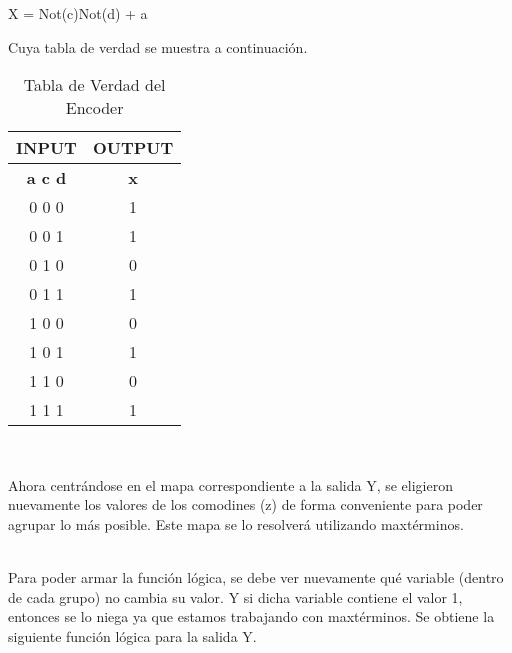 \begin{center}
X = Not(c)Not(d) + a
\end{center}
Cuya tabla de verdad se muestra a continuación.
\begin{center}
	\begin{table}[h!]
		\begin{center}
			\caption{Tabla de Verdad del Encoder}
			\begin{tabular}{|c|c|}
				\hline
				\textbf{INPUT} & \textbf{OUTPUT} \\
				\hline
				\textbf{a c d} & \textbf{x} \\
				\hline
				0 0 0 & 1\\
				\hline
				0 0 1 & 1 \\
				\hline
				0 1 0 & 0\\
				\hline
				0 1 1 & 1\\
				\hline
				1 0 0 & 0\\
				\hline
				1 0 1 & 1\\
				\hline
				1 1 0 & 0\\
				\hline
				1 1 1 & 1\\
				\hline
			\end{tabular} \\
		\end{center}
	\end{table}
\end{center}

Ahora centr\'andose en el mapa correspondiente a la salida Y, se eligieron nuevamente los valores de los comodines (z) de forma conveniente para poder agrupar lo m\'as posible. Este mapa se lo resolver\'a utilizando maxt\'erminos.
\\
\begin{Karnaugh}
\end{Karnaugh}
\\
Para poder armar la funci\'on l\'ogica, se debe ver nuevamente qu\'e variable (dentro de cada grupo) no cambia su valor. Y si dicha variable contiene el valor 1, entonces se lo niega ya que estamos trabajando con maxt\'erminos. Se obtiene la siguiente funci\'on l\'ogica para la salida Y.

